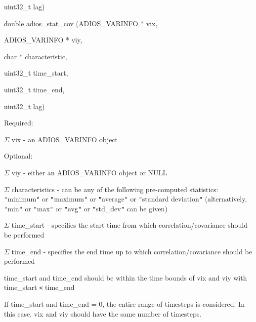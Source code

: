 \vspace{10pt}
\parindent=7pt
uint32\_t        lag)

\vspace{22pt}
\parindent=0pt
double adios\_stat\_cov (ADIOS\_VARINFO * vix, 

\vspace{10pt}
ADIOS\_VARINFO * viy, 

\vspace{10pt}
\parindent=64pt
char          * characteristic, 

\vspace{10pt}
\parindent=46pt
uint32\_t        time\_start, 

\vspace{10pt}
\parindent=28pt
uint32\_t        time\_end, 

\vspace{10pt}
\parindent=7pt
uint32\_t        lag)

\vspace{22pt}
\parindent=0pt
Required:

\vspace{10pt}
\ensuremath{\Sigma} vix - an ADIOS\_VARINFO object

\vspace{10pt}
Optional:

\vspace{10pt}
\ensuremath{\Sigma} viy - either an ADIOS\_VARINFO object or NULL 

\vspace{10pt}
\ensuremath{\Sigma} characteristics - can be any of the following pre-computed 
statistics: \texttt{"}minimum\texttt{"} or \texttt{"}maximum\texttt{"} or \texttt{"}average\texttt{"} 
or \texttt{"}standard deviation\texttt{"} (alternatively, \texttt{"}min\texttt{"} 
or \texttt{"}max\texttt{"} or \texttt{"}avg\texttt{"} or \texttt{"}std\_dev\texttt{"} 
can be given)

\vspace{10pt}
\ensuremath{\Sigma} time\_start - specifies the start time from which correlation/covariance 
should be performed

\vspace{10pt}
\ensuremath{\Sigma} time\_end - specifies the end time up to which correlation/covariance 
should be performed

\vspace{10pt}
\leftskip=36pt
time\_start and time\_end should be within the time bounds of vix and viy with 
time\_start \texttt{<} time\_end

\vspace{10pt}
If time\_start and time\_end = 0, the entire range of timesteps is considered. 
In this case, vix and viy should have the same number of timesteps.

